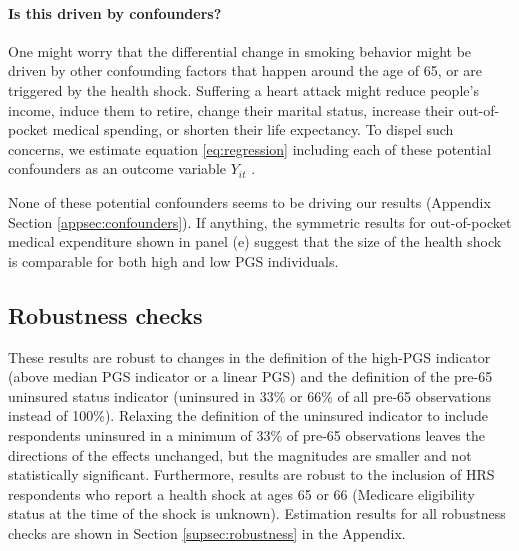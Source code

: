 \documentclass[11pt]{article}
\begin{document}
\paragraph{Is this driven by confounders?}
One might worry that the differential change in smoking behavior might be driven by other confounding factors that happen around the age of 65, or are triggered by the health shock.
Suffering a heart attack might reduce people's income, induce them to retire, change their marital status, increase their out-of-pocket medical spending, or shorten their life expectancy.
To dispel such concerns, we estimate equation \ref{eq:regression} including each of these potential confounders as an outcome variable $Y_{it}$ \citep{Pei2018}.

None of these potential confounders seems to be driving our results (Appendix Section \ref{appsec:confounders}).
If anything, the symmetric results for out-of-pocket medical expenditure shown in panel (e) suggest that the size of the health shock is comparable for both high and low PGS individuals.%

\subsection{Robustness checks} \label{sec:robustness}
These results are robust to changes in the definition of the high-PGS indicator (above median PGS indicator or a linear PGS) and the definition of the pre-65 uninsured status indicator (uninsured in 33\% or 66\% of all pre-65 observations instead of 100\%).
Relaxing the definition of the uninsured indicator to include respondents uninsured in a minimum of 33\% of pre-65 observations leaves the directions of the effects unchanged, but the magnitudes are smaller and not statistically significant.
Furthermore, results are robust to the inclusion of HRS respondents who report a health shock at ages 65 or 66 (Medicare eligibility status at the time of the shock is unknown).
Estimation results for all robustness checks are shown in Section \ref{supsec:robustness} in the Appendix.
\end{document}
